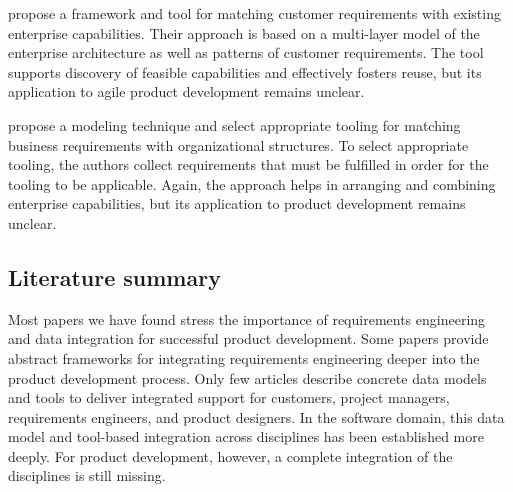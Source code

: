 \cite{belfadel2022requirements} propose a framework and tool for matching customer requirements with existing enterprise capabilities.
Their approach is based on a multi-layer model of the enterprise architecture as well as patterns of customer requirements.
The tool supports discovery of feasible capabilities and effectively fosters reuse, but its application to agile product development remains unclear.

\cite{9447081} propose a modeling technique and select appropriate tooling for matching business requirements with organizational structures.
To select appropriate tooling, the authors collect requirements that must be fulfilled in order for the tooling to be applicable.
Again, the approach helps in arranging and combining enterprise capabilities, but its application to product development remains unclear.

\subsection{Literature summary}

Most papers we have found stress the importance of requirements engineering and data integration for successful product development.
Some papers provide abstract frameworks for integrating requirements engineering deeper into the product development process.
Only few articles describe concrete data models and tools to deliver  integrated support for customers, project managers, requirements engineers, and product designers.
In the software domain, this data model and tool-based integration across disciplines has been established more deeply.
For product development, however, a complete integration of the disciplines is still missing.
